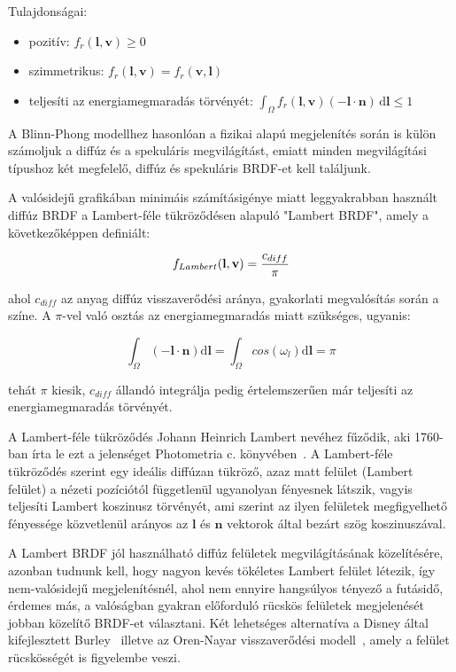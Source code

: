 Tulajdonságai:

\begin{itemize}[noitemsep]
\item pozitív: \(f_r(\mathbf{l},\mathbf{v}) \geq 0\)
\item szimmetrikus: \(f_r(\mathbf{l},\mathbf{v}) = f_r(\mathbf{v},\mathbf{l})\)
\item teljesíti az energiamegmaradás törvényét: \(\int_\Omega f_r(\mathbf{l},\mathbf{v}) (-\mathbf{l} \cdot \mathbf{n})\,\mathrm{d}\mathbf{l} \leq 1\)
\end{itemize}

A Blinn-Phong modellhez hasonlóan a fizikai alapú megjelenítés során is külön számoljuk a diffúz és a spekuláris megvilágítást, emiatt minden megvilágítási típushoz két megfelelő, diffúz és spekuláris BRDF-et kell találjunk.

A valósidejű grafikában minimáis számításigénye miatt leggyakrabban használt diffúz BRDF a Lambert-féle tükröződésen alapuló "Lambert BRDF", amely a következőképpen definiált:

\[
f_{Lambert}(\mathbf{l}, \mathbf{v}) = { c_{diff} \over \pi }
\]

ahol \(c_{diff}\) az anyag diffúz visszaverődési aránya, gyakorlati megvalósítás során a színe. A \(\pi\)-vel való osztás az energiamegmaradás miatt szükséges, ugyanis:

\[
\int_\Omega { (-\mathbf{l} \cdot \mathbf{n}) \mathrm{d}\mathbf{l} } = \int_\Omega { cos(\omega_l) \mathrm{d}\mathbf{l} } = \pi
\]

tehát \(\pi\) kiesik, \(c_{diff}\) állandó integrálja pedig értelemszerűen már teljesíti az energiamegmaradás törvényét.

A Lambert-féle tükröződés Johann Heinrich Lambert nevéhez fűződik, aki 1760-ban írta le ezt a jelenséget Photometria c. könyvében~\cite{klett1760ih}. A Lambert-féle tükröződés szerint egy ideális diffúzan tükröző, azaz matt felület (Lambert felület) a nézeti pozíciótól függetlenül ugyanolyan fényesnek látszik, vagyis teljesíti Lambert koszinusz törvényét, ami szerint az ilyen felületek megfigyelhető fényessége közvetlenül arányos az \(\mathbf{l}\) és \(\mathbf{n}\) vektorok által bezárt szög koszinuszával.

A Lambert BRDF jól használható diffúz felületek megvilágításának közelítésére, azonban tudnunk kell, hogy nagyon kevés tökéletes Lambert felület létezik, így nem-valósidejű megjelenítésnél, ahol nem ennyire hangsúlyos tényező a futásidő, érdemes más, a valóságban gyakran előforduló rücskös felületek megjelenését jobban közelítő BRDF-et választani. Két lehetséges alternatíva a Disney által kifejlesztett Burley~\cite{burley2012physically} illetve az Oren-Nayar visszaverődési modell~\cite{oren1994generalization}, amely a felület rücskösségét is figyelembe veszi.

